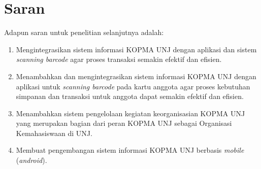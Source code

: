 \section{Saran}
Adapun saran untuk penelitian selanjutnya adalah:
\begin{enumerate} 
	\item Mengintegrasikan sistem informasi KOPMA UNJ dengan aplikasi dan sistem \textit{scanning barcode} agar proses transaksi semakin efektif dan efisien.
	\item Menambahkan dan mengintegrasikan sistem informasi KOPMA UNJ dengan aplikasi untuk \textit{scanning barcode} pada kartu anggota agar proses kebutuhan simpanan dan transaksi untuk anggota dapat semakin efektif dan efisien.
	\item Menambahkan sistem pengelolaan kegiatan keorganisasian KOPMA UNJ yang merupakan bagian dari peran KOPMA UNJ sebagai Organisasi Kemahasiswaan di UNJ.
	\item Membuat pengembangan sistem informasi KOPMA UNJ berbasis \textit{mobile} (\textit{android}).
\end{enumerate}


\begin{comment}

\end{comment}
